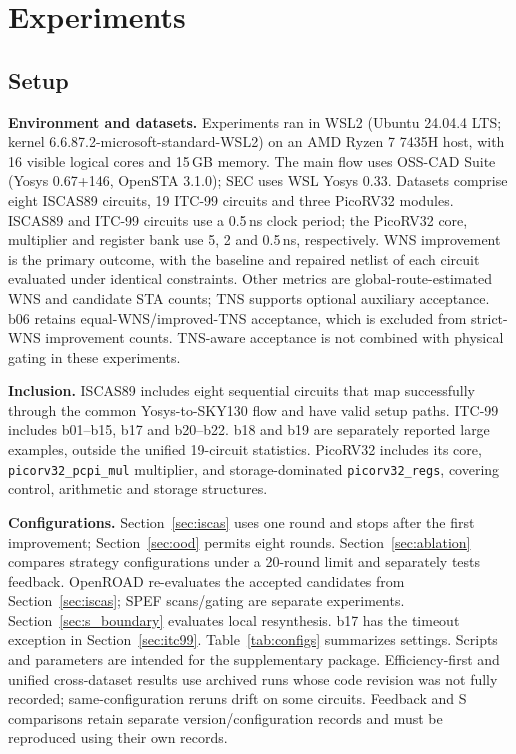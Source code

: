 \documentclass[preprint,12pt]{elsarticle}
\begin{document}
\section{Experiments}\label{sec:exp}
\subsection{Setup}\label{sec:setup}
\textbf{Environment and datasets.} Experiments ran in WSL2 (Ubuntu 24.04.4 LTS; kernel 6.6.87.2-microsoft-standard-WSL2) on an AMD Ryzen 7 7435H host, with 16 visible logical cores and 15\,GB memory. The main flow uses OSS-CAD Suite (Yosys 0.67+146, OpenSTA 3.1.0); SEC uses WSL Yosys 0.33. Datasets comprise eight ISCAS89 circuits, 19 ITC-99 circuits and three PicoRV32 modules. ISCAS89 and ITC-99 circuits use a 0.5\,ns clock period; the PicoRV32 core, multiplier and register bank use 5, 2 and 0.5\,ns, respectively. WNS improvement is the primary outcome, with the baseline and repaired netlist of each circuit evaluated under identical constraints. Other metrics are global-route-estimated WNS and candidate STA counts; TNS supports optional auxiliary acceptance. b06 retains equal-WNS/improved-TNS acceptance, which is excluded from strict-WNS improvement counts. TNS-aware acceptance is not combined with physical gating in these experiments.

\textbf{Inclusion.} ISCAS89 includes eight sequential circuits that map successfully through the common Yosys-to-SKY130 flow and have valid setup paths. ITC-99 includes b01--b15, b17 and b20--b22. b18 and b19 are separately reported large examples, outside the unified 19-circuit statistics. PicoRV32 includes its core, \texttt{picorv32\_pcpi\_mul} multiplier, and storage-dominated \texttt{picorv32\_regs}, covering control, arithmetic and storage structures.

\textbf{Configurations.} Section~\ref{sec:iscas} uses one round and stops after the first improvement; Section~\ref{sec:ood} permits eight rounds. Section~\ref{sec:ablation} compares strategy configurations under a 20-round limit and separately tests feedback. OpenROAD re-evaluates the accepted candidates from Section~\ref{sec:iscas}; SPEF scans/gating are separate experiments. Section~\ref{sec:s_boundary} evaluates local resynthesis. b17 has the timeout exception in Section~\ref{sec:itc99}. Table~\ref{tab:configs} summarizes settings. Scripts and parameters are intended for the supplementary package. Efficiency-first and unified cross-dataset results use archived runs whose code revision was not fully recorded; same-configuration reruns drift on some circuits. Feedback and S comparisons retain separate version/configuration records and must be reproduced using their own records.
\end{document}

